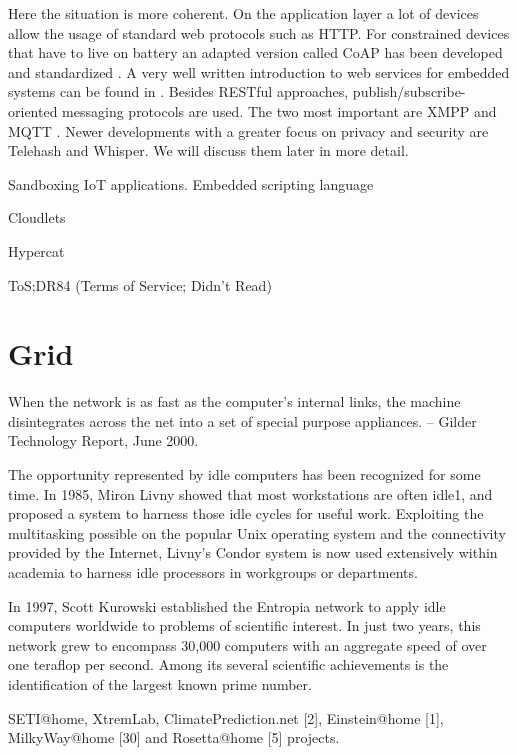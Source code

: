 Here the situation is more coherent. 
On the application layer a lot of devices allow the usage of standard web protocols such as HTTP. For constrained devices that have to live on battery an adapted version called CoAP has been developed and standardized \cite{shelby2014constrained}. A very well written introduction to web services for embedded systems can be found in \cite{Shelby:2010}. Besides RESTful approaches, publish/subscribe-oriented messaging protocols are used. The two most important are XMPP \cite{saint2011extensible} and MQTT \cite{Hunkeler:2008}. 
Newer developments with a greater focus on privacy and security are Telehash and Whisper. We will discuss them later in more detail.   



Sandboxing IoT applications. Embedded scripting language \cite{Kovatsch:2012}


Cloudlets \cite{Verbelen:2012,Satyanarananan:2013}


Hypercat

 ToS;DR84 (Terms of Service; Didn’t Read)

 \section{Grid}

 When the network is as fast as the computer's internal links, the machine disintegrates across the net into a set of special purpose appliances.
-- Gilder Technology Report, June 2000.

The opportunity represented by idle computers has been recognized for some time. In 1985, Miron Livny showed that most workstations are often idle1, and proposed a system to harness those idle cycles for useful work. Exploiting the multitasking possible on the popular Unix operating system and the connectivity provided by the Internet, Livny's Condor system is now used extensively within academia to harness idle processors in workgroups or departments.

 In 1997, Scott Kurowski established the Entropia network to apply idle computers worldwide to problems of scientific interest. In just two years, this network grew to encompass 30,000 computers with an aggregate speed of over one teraflop per second. Among its several scientific achievements is the identification of the largest known prime number.

 SETI@home, XtremLab, ClimatePrediction.net
[2], Einstein@home [1], MilkyWay@home [30]
and Rosetta@home [5] projects.


